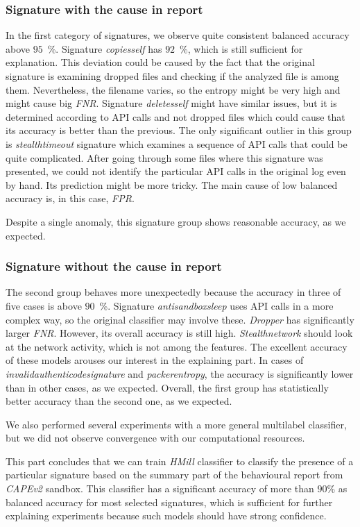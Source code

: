 \subsubsection*{Signature with the cause in report}
In the first category of signatures, we observe quite consistent balanced accuracy above $95$~\%. Signature \emph{copiesself} has $92$~\%, which is still sufficient for explanation. This deviation could be caused by the fact that the original signature is examining dropped files and checking if the analyzed file is among them. Nevertheless, the filename varies, so the entropy might be very high and might cause big \emph{FNR}. Signature \emph{deletesself} might have similar issues, but it is determined according to API calls and not dropped files which could cause that its accuracy is better than the previous. The only significant outlier in this group is \emph{stealthtimeout} signature which examines a sequence of API calls that could be quite complicated. After going through some files where this signature was presented, we could not identify the particular API calls in the original log even by hand. Its prediction might be more tricky. The main cause of low balanced accuracy is, in this case, \emph{FPR}.

Despite a single anomaly, this signature group shows reasonable accuracy, as we expected.

\subsubsection*{Signature without the cause in report}
The second group behaves more unexpectedly because the accuracy in three of five cases is above $90$~\%. Signature \emph{antisandboxsleep} uses API calls in a more complex way, so the original classifier may involve these. \emph{Dropper} has significantly larger \emph{FNR}. However, its overall accuracy is still high. \emph{Stealthnetwork} should look at the network activity, which is not among the features. The excellent accuracy of these models arouses our interest in the explaining part. In cases of \emph{invalidauthenticodesignature} and \emph{packerentropy}, the accuracy is significantly lower than in other cases, as we expected. Overall, the first group has statistically better accuracy than the second one, as we expected.

We also performed several experiments with a more general multilabel classifier, but we did not observe convergence with our computational resources.

This part concludes that we can train \emph{HMill} classifier to classify the presence of a particular signature based on the summary part of the behavioural report from \emph{CAPEv2} sandbox. This classifier has a significant accuracy of more than $90\%$ as balanced accuracy for most selected signatures, which is sufficient for further explaining experiments because such models should have strong confidence.


